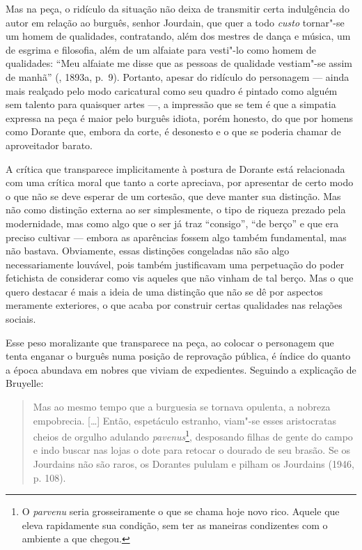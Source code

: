Mas na peça, o ridículo da situação não deixa de transmitir certa
indulgência do autor em relação ao burguês, senhor Jourdain, que quer a
todo \emph{custo} tornar"-se um homem de qualidades, contratando, além
dos mestres de dança e música, um de esgrima e filosofia, além de um
alfaiate para vesti"-lo como homem de qualidades: ``Meu alfaiate me
disse que as pessoas de qualidade vestiam"-se assim de manhã''
(, 1893a, p.~9). Portanto, apesar do ridículo do personagem ---
ainda mais realçado pelo modo caricatural como seu quadro é pintado como
alguém sem talento para quaisquer artes ---, a impressão que se tem é que
a simpatia expressa na peça é maior pelo burguês idiota, porém honesto,
do que por homens como Dorante que, embora da corte, é desonesto e o que
se poderia chamar de aproveitador barato.

A crítica que transparece implicitamente à postura de Dorante está
relacionada com uma crítica moral que tanto a corte apreciava, por
apresentar de certo modo o que não se deve esperar de um cortesão, que
deve manter sua distinção. Mas não como distinção externa ao ser
simplesmente, o tipo de riqueza prezado pela modernidade, mas como algo
que o ser já traz ``consigo'', ``de berço'' e que era preciso cultivar
--- embora as aparências fossem algo também fundamental, mas não bastava.
Obviamente, essas distinções congeladas não são algo necessariamente
louvável, pois também justificavam uma perpetuação do poder fetichista de
considerar como vis aqueles que não vinham de tal berço. Mas o que
quero destacar é mais a ideia de uma distinção que não se dê por
aspectos meramente exteriores, o que acaba por construir certas
qualidades nas relações sociais.

Esse peso moralizante que transparece na peça, ao colocar o personagem
que tenta enganar o burguês numa posição de reprovação pública, é índice
do quanto a época abundava em nobres que viviam de expedientes. Seguindo
a explicação de Bruyelle:

\begin{quote}
Mas ao mesmo tempo que a burguesia se tornava opulenta, a nobreza
empobrecia. [\ldots{}] Então, espetáculo estranho, viam"-se esses
aristocratas cheios de orgulho adulando \emph{pavenus}\footnote{O
  \emph{parvenu} seria grosseiramente o que se chama hoje novo rico.
  Aquele que eleva rapidamente sua condição, sem ter as maneiras
  condizentes com o ambiente a que chegou.}, desposando filhas de gente
do campo e indo buscar nas lojas o dote para retocar o dourado de seu
brasão. Se os Jourdains não são raros, os Dorantes pululam e pilham os
Jourdains (1946, p. 108).
\end{quote}

